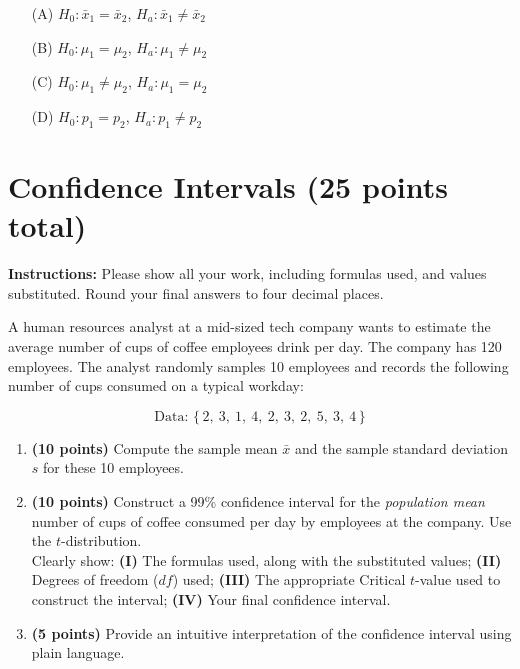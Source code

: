 \documentclass{article}
\newcommand{\blankbox}[2][3cm]{%
    \vspace{-0.5em}
    \begin{figure}[H]
        \makebox[\linewidth]{%
            \begin{tcolorbox}[
                colback=white, 
                colframe=white,  %
                width=#2, %
                height=#1,
                boxrule=0.2mm
            ]
            \end{tcolorbox}
        }
    \end{figure}
    \vspace{-2em}
}
\begin{document}
\begin{enumerate}
    \begin{enumerate}
        \item[(A)] $H_0: \bar{x}_1 = \bar{x}_2$, $H_a: \bar{x}_1 \neq \bar{x}_2$ 
        \item[(B)] $H_0: \mu_1 = \mu_2$, $H_a: \mu_1 \neq \mu_2$
        \item[(C)] $H_0: \mu_1 \neq \mu_2$, $H_a: \mu_1 = \mu_2$
        \item[(D)]  $H_0: p_1 = p_2$, $H_a: p_1 \neq p_2$
    \end{enumerate}
    \blankbox[2cm]{1.0\linewidth}
    


\end{enumerate}


\newpage
\section{Confidence Intervals (25 points total)}
\noindent\textbf{Instructions:} Please show all your work, including formulas used, and values substituted. Round your final answers to four decimal places.

\bigskip
\noindent A human resources analyst at a mid-sized tech company wants to estimate the average number of cups of coffee employees drink per day. The company has 120 employees. The analyst randomly samples 10 employees and records the following number of cups consumed on a typical workday:

\[
\text{Data: } \{\, 2,\ 3,\ 1,\ 4,\ 2,\ 3,\ 2,\ 5,\ 3,\ 4 \,\}
\]

\begin{enumerate}
    \item \textbf{(10 points)} Compute the sample mean $\bar{x}$ and the sample standard deviation $s$ for these 10 employees. \blankbox[6cm]{1.0\linewidth}
    
    \item \textbf{(10 points)} Construct a 99\% confidence interval for the \emph{population mean} number of cups of coffee consumed per day by employees at the company. Use the $t$-distribution. \\ Clearly show:
    \textbf{(I)} The formulas used, along with the substituted values;  
    \textbf{(II)} Degrees of freedom ($df$) used;
    \textbf{(III)} The appropriate Critical $t$-value used to construct the interval;
    \textbf{(IV)} Your final confidence interval.
    \blankbox[8.5cm]{1.0\linewidth}

    \item \textbf{(5 points)} Provide an intuitive interpretation of the confidence interval using plain language. \blankbox[3cm]{1.0\linewidth}
\end{enumerate}


\end{document}
